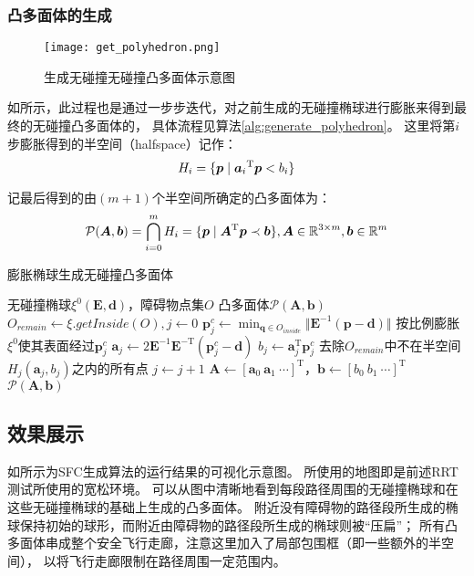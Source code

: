 \subsubsection{凸多面体的生成}
\begin{figure}[ht]
  \centering
  \texttt{[image: get\_polyhedron.png]}
  \caption{生成无碰撞无碰撞凸多面体示意图}
  \label{fig:get_polyhedron}
\end{figure}
如所示，此过程也是通过一步步迭代，对之前生成的无碰撞椭球进行膨胀来得到最终的无碰撞凸多面体的，
具体流程见算法\ref{alg:generate_polyhedron}。
这里将第$i$步膨胀得到的半空间（halfspace）记作：
\begin{equation}
  H_i = \{\bm{p} \mid {\bm{a}_i}^{\text{T}}\bm{p} < b_i\}
  \label{equ:halfspace_i}
\end{equation}

记最后得到的由$(m+1)$个半空间所确定的凸多面体为：
\begin{equation}
  \mathcal{P}(\bm{A}, \bm{b}) = \bigcap_{i=0}^m H_i = \{\bm{p} \mid {\bm{A}}^{\text{T}}\bm{p} \prec \bm{b}\}, \bm{A} \in \mathbb{R}^{3\times m},\bm{b} \in \mathbb{R}^m
\end{equation}
\begin{algorithm}[h]
      \wuhao
      \caption{膨胀椭球生成无碰撞凸多面体\label{alg:generate_polyhedron}}  
      \begin{algorithmic}[1] %
          \REQUIRE 无碰撞椭球$\xi^{0}(\bm{E},\bm{d})$，障碍物点集$O$ 
          \ENSURE 凸多面体$\mathcal{P}(\bm{A},\bm{b})$
          \STATE  $O_{remain}\gets \xi.getInside(O),j \gets 0$
      \STATE $\bm{p}_{j}^{c} \gets \min_{\bm{q} \in O_{inside}}\Vert \bm{E}^{-1}(\bm{p}-\bm{d}) \Vert$ 
      \STATE 按比例膨胀$\xi^{0}$使其表面经过$\bm{p}_{j}^{c}$
      \STATE $\bm{a}_{j} \gets 2\bm{E}^{-1}\bm{E}^{-\text{T}}(\bm{p}_{j}^{c}-\bm{d})$
      \STATE $b_{j} \gets \bm{a}_{j}^{\text{T}}\bm{p}_{j}^{c}$
      \STATE 去除$O_{remain}$中不在半空间$H_{j}(\bm{a}_{j},b_{j})$之内的所有点
      \STATE $j \gets j+1$
    \ENDWHILE
    \STATE $\bm{A} \gets [\bm{a}_{0}\ \bm{a}_{1}\ \cdots]^{\text{T}}$，$\bm{b} \gets [b_0 \ b_1 \ \cdots]^{\text{T}}$
    \RETURN $\mathcal{P}(\bm{A},\bm{b})$
      \end{algorithmic}  
\end{algorithm} 

\subsection{效果展示}\label{subsec:impl_of_sfc_gen_algorithm}
如所示为SFC生成算法的运行结果的可视化示意图。
所使用的地图即是前述RRT测试所使用的宽松环境。
可以从图中清晰地看到每段路径周围的无碰撞椭球和在这些无碰撞椭球的基础上生成的凸多面体。
附近没有障碍物的路径段所生成的椭球保持初始的球形，而附近由障碍物的路径段所生成的椭球则被“压扁”；
所有凸多面体串成整个安全飞行走廊，注意这里加入了局部包围框（即一些额外的半空间），
以将飞行走廊限制在路径周围一定范围内。

